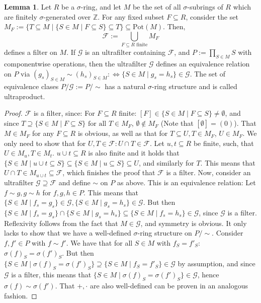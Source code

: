 \documentclass{article}
\def\Z{\mathbb{Z}}
\def\s{\sigma}
\def\fa{\text{ for all }}
\theoremstyle{definition}
\newtheorem{lem}[Satz]{Lemma}
\begin{document}
\begin{lem}\label{lemmafilters}
Let $R$ be a $\s$-ring, and let $M$ be the set of all $\s$-subrings of $R$ which are finitely $\s$-generated over $\Z$. For any fixed subset $F \subseteq R$, consider the set $M_F:= \{ T \subseteq M \mid \{S \in M \mid F \subseteq S \} \subseteq T \} \subseteq \text{Pot}(M)$. 
Then, \[ \mathcal{F}:= \bigcup_{ F \subseteq R \text{ finite} } M_F \]
 defines a filter on $M$. If $\mathcal{G}$ is an ultrafilter containing $\mathcal{F}$, and $P:= \prod_{S \in M} S$ with componentwise operations,
 then the ultrafilter $\mathcal{G}$ defines an equivalence relation on $P$ via $(g_s)_{S \in M} \sim (h_s)_{S \in M} : \Leftrightarrow \{ S \in M \mid g_s = h_s \} \in \mathcal{G}$. 
The set of equivalence clases $P/\mathcal{G}:= P/\sim$ has a natural $\s$-ring structure and is called ultraproduct. %
\begin{proof}
$\mathcal{F}$ is a filter, since: 
  For $F \subseteq R$ finite: $[F] \in \{ S \in M \mid F \subseteq S \} \neq \emptyset$, and since $T \supseteq \{ S \in M \mid F \subseteq S \} \fa T \in M_F$, $\emptyset \notin M_F$ (Note that $[\emptyset] = (0)$).
  That $M \in M_F$ for any $F \subseteq R$ is obvious, as well as that for $T \subseteq U, T \in M_F$, $U \in M_F$. We only need to show that for $U,T \in \mathcal{F}: U \cap T \in \mathcal{F}$.
  Let $u, t \subseteq R$ be finite, such, that $U \in M_u, T \in M_t$. $u \cup t \subseteq R$ is also finite and it holds that  $\{ S \in M \mid u \cup t \subseteq S \} \subseteq \{ S \in M \mid u \subseteq S \} \subseteq U$,
 and similarly for $T$. This means that $U \cap T \in M_{u \cup t} \subseteq \mathcal{F}$, which finishes the proof that $\mathcal{F}$ is a filter.
 Now, consider an ultrafilter $\mathcal{G} \supseteq \mathcal{F}$ and define $\sim$ on $P$ as above. This is an equivalence relation: Let $f \sim g, g \sim h$ for $f,g,h \in P$. 
 This means that $\{ S \in M \mid f_s = g_s \} \in \mathcal{G}, \{ S \in M \mid g_s = h_s \} \in \mathcal{G}$. But then $\{ S \in M \mid f_s = g_s \} \cap \{ S \in M \mid g_s = h_s \} \subseteq \{ S \in M \mid f_s = h_s \} \in \mathcal{G}$, since $\mathcal{G}$ is a filter.
 Reflexivity follows from the fact that $M \in \mathcal{G}$, and symmetry is obvious. It only lacks to show that we have a well-defined $\s$-ring structure on $P/\sim$.
 Consider $f,f' \in P$ with $f \sim f'$. We have that for all $S \in M$ with $f_S = f'_S$:  $\sigma(f)_S = \sigma(f')_S$. 
 But then $\{ S \in M \mid \s(f)_S = \s(f')_S \} \supseteq \{ S \in M \mid f_S = f'_S \} \in \mathcal{G}$ by assumption, and since $\mathcal{G}$ is a filter, this means that $\{ S \in M \mid \s(f)_S = \s(f')_S \} \in \mathcal{G}$,
 hence $\s(f) \sim \s(f')$. That $+, \cdot$ are also well-defined can be proven in an analogous fashion.
\end{proof}
\end{lem}
\end{document}
